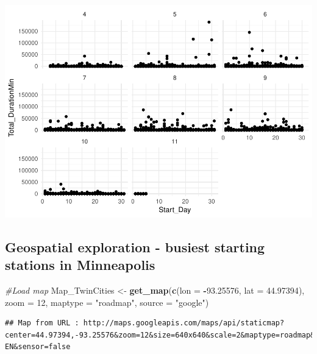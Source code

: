 \documentclass[]{article}
\newenvironment{Shaded}{\begin{snugshade}}{\end{snugshade}}
\newcommand{\KeywordTok}[1]{\textcolor[rgb]{0.13,0.29,0.53}{\textbf{#1}}}
\newcommand{\DataTypeTok}[1]{\textcolor[rgb]{0.13,0.29,0.53}{#1}}
\newcommand{\DecValTok}[1]{\textcolor[rgb]{0.00,0.00,0.81}{#1}}
\newcommand{\FloatTok}[1]{\textcolor[rgb]{0.00,0.00,0.81}{#1}}
\newcommand{\StringTok}[1]{\textcolor[rgb]{0.31,0.60,0.02}{#1}}
\newcommand{\CommentTok}[1]{\textcolor[rgb]{0.56,0.35,0.01}{\textit{#1}}}
\newcommand{\OperatorTok}[1]{\textcolor[rgb]{0.81,0.36,0.00}{\textbf{#1}}}
\newcommand{\NormalTok}[1]{#1}
\begin{document}
\includegraphics{Nice_Ride_Project_Stat_ReportDRAFT_files/figure-latex/unnamed-chunk-16-1.pdf}

\subsection{Geospatial exploration - busiest starting stations in
Minneapolis}\label{geospatial-exploration---busiest-starting-stations-in-minneapolis}

\begin{Shaded}
\begin{Highlighting}[]
\CommentTok{#Load map}
\NormalTok{Map_TwinCities <-}\StringTok{ }\KeywordTok{get_map}\NormalTok{(}\KeywordTok{c}\NormalTok{(}\DataTypeTok{lon =} \OperatorTok{-}\FloatTok{93.25576}\NormalTok{, }\DataTypeTok{lat =} \FloatTok{44.97394}\NormalTok{), }\DataTypeTok{zoom =} \DecValTok{12}\NormalTok{, }\DataTypeTok{maptype =} \StringTok{"roadmap"}\NormalTok{, }\DataTypeTok{source =} \StringTok{"google"}\NormalTok{)}
\end{Highlighting}
\end{Shaded}

\begin{verbatim}
## Map from URL : http://maps.googleapis.com/maps/api/staticmap?center=44.97394,-93.25576&zoom=12&size=640x640&scale=2&maptype=roadmap&language=en-EN&sensor=false
\end{verbatim}

\begin{Shaded}
\end{Shaded}
\end{document}
